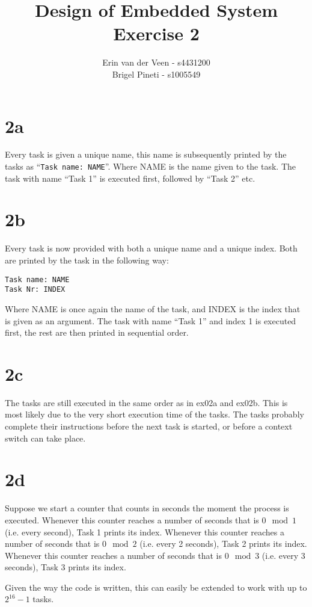 \documentclass{scrartcl}
\title{Design of Embedded System\\Exercise 2}
\author{Erin van der Veen - s4431200\\
	Brigel Pineti - s1005549}
\begin{document}
\maketitle

\section*{2a}
Every task is given a unique name, this name is subsequently printed by the tasks as ``\lstinline|Task name: NAME|''.
Where NAME is the name given to the task.
The task with name ``Task 1'' is executed first, followed by ``Task 2'' etc.

\section*{2b}
Every task is now provided with both a unique name and a unique index.
Both are printed by the task in the following way:
\begin{lstlisting}
Task name: NAME
Task Nr: INDEX
\end{lstlisting}
Where NAME is once again the name of the task, and INDEX is the index that is given as an argument.
The task with name ``Task 1'' and index 1 is executed first, the rest are then printed in sequential order.

\section*{2c}
The tasks are still executed in the same order as in ex02a and ex02b.
This is most likely due to the very short execution time of the tasks.
The tasks probably complete their instructions before the next task is started, or before a context switch can take place.

\section*{2d}
Suppose we start a counter that counts in seconds the moment the process is executed.
Whenever this counter reaches a number of seconds that is $0 \mod 1$ (i.e. every second), Task 1 prints its index.
Whenever this counter reaches a number of seconds that is $0 \mod 2$ (i.e. every 2 seconds), Task 2 prints its index.
Whenever this counter reaches a number of seconds that is $0 \mod 3$ (i.e. every 3 seconds), Task 3 prints its index.

Given the way the code is written, this can easily be extended to work with up to $2^{16} - 1$ tasks.
\end{document}
